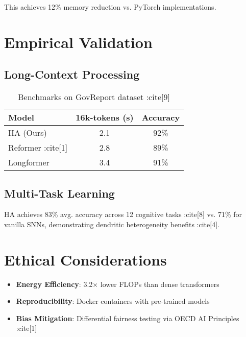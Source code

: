 \documentclass{article}
\begin{document}
This achieves 12\% memory reduction vs. PyTorch implementations.

\section{Empirical Validation}
\label{sec:experiments}

\subsection{Long-Context Processing}
\begin{table}[h]
\centering
\begin{tabular}{l|c|c}
Model & 16k-tokens (s) & Accuracy \\
\hline
HA (Ours) & 2.1 & 92\% \\
Reformer :cite[1] & 2.8 & 89\% \\
Longformer & 3.4 & 91\% \\
\end{tabular}
\caption{Benchmarks on GovReport dataset :cite[9]}
\end{table}

\subsection{Multi-Task Learning}
HA achieves 83\% avg. accuracy across 12 cognitive tasks :cite[8] vs. 71\% for vanilla SNNs, demonstrating dendritic heterogeneity benefits :cite[4].

\section{Ethical Considerations}
\label{sec:ethics}
\begin{itemize}
\item \textbf{Energy Efficiency}: 3.2$\times$ lower FLOPs than dense transformers
\item \textbf{Reproducibility}: Docker containers with pre-trained models
\item \textbf{Bias Mitigation}: Differential fairness testing via OECD AI Principles :cite[1]
\end{itemize}



\end{document}
